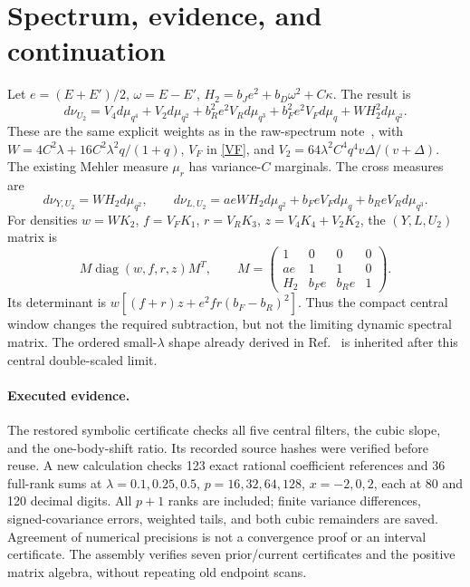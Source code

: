 \documentclass[11pt,a4paper]{article}
\begin{document}
\section{Spectrum, evidence, and continuation}
Let $e=(E+E')/2$, $\omega=E-E'$,
$H_2=b_Je^2+b_D\omega^2+C\kappa$. The result is
\begin{equation}
 d\nu_{U_2}=V_4d\mu_{q^4}+V_2d\mu_{q^2}
 +b_R^2e^2V_Rd\mu_{q^3}+b_F^2e^2V_Fd\mu_q
 +WH_2^2d\mu_{q^2}.\label{spectrum}
\end{equation}
These are the same explicit weights as in the raw-spectrum
note~\cite{raw}, with $W=4C^2\lambda+16C^2\lambda^2q/(1+q)$,
$V_F$ in \eqref{VF}, and $V_2=64\lambda^2C^4q^4v\Delta/(v+\Delta)$.
The existing Mehler measure $\mu_r$ has variance-$C$ marginals.
The cross measures are
\begin{equation}
 d\nu_{Y,U_2}=WH_2d\mu_{q^2},\qquad
 d\nu_{L,U_2}=aeWH_2d\mu_{q^2}+b_FeV_Fd\mu_q+b_ReV_Rd\mu_{q^3}.
\end{equation}
For densities $w=WK_2$, $f=V_FK_1$, $r=V_RK_3$,
$z=V_4K_4+V_2K_2$, the $(Y,L,U_2)$ matrix is
\begin{equation}
 M\operatorname{diag}(w,f,r,z)M^T,\qquad
 M=\begin{pmatrix}1&0&0&0\\ae&1&1&0\\H_2&b_Fe&b_Re&1\end{pmatrix}.
\end{equation}
Its determinant is $w[(f+r)z+e^2fr(b_F-b_R)^2]$.
Thus the compact central window changes the required subtraction,
but not the limiting dynamic spectral matrix. The ordered
small-$\lambda$ shape already derived in Ref.~\cite{raw} is
inherited after this central double-scaled limit.

\paragraph{Executed evidence.}
The restored symbolic certificate checks all five central filters,
the cubic slope, and the one-body-shift ratio. Its recorded source
hashes were verified before reuse. A new calculation checks
123 exact rational coefficient references and 36 full-rank sums
at $\lambda=0.1,0.25,0.5$, $p=16,32,64,128$, $x=-2,0,2$,
each at 80 and 120 decimal digits. All $p+1$ ranks are included;
finite variance differences, signed-covariance errors, weighted
tails, and both cubic remainders are saved. Agreement of numerical
precisions is not a convergence proof or an interval certificate.
The assembly verifies seven prior/current certificates and the
positive matrix algebra, without repeating old endpoint scans.
\end{document}
